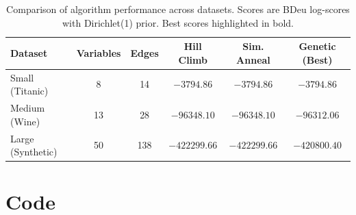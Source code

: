 \documentclass[twoside,11pt]{article}
\begin{document}
\begin{table}[htbp]
\centering
\caption{Comparison of algorithm performance across datasets. Scores are BDeu log-scores with Dirichlet(1) prior. Best scores highlighted in bold.}
\label{tab:results}
\begin{tabular}{lccccc}
\toprule
Dataset & Variables & Edges & Hill Climb & Sim. Anneal & Genetic (Best) \\
\midrule
Small (Titanic) & 8 & 14 & $-3794.86$ & $-3794.86$ & $\mathbf{-3794.86}$ \\
Medium (Wine) & 13 & 28 & $-96348.10$ & $-96348.10$ & $\mathbf{-96312.06}$ \\
Large (Synthetic) & 50 & 138 & $-422299.66$ & $-422299.66$ & $\mathbf{-420800.40}$ \\
\bottomrule
\end{tabular}
\end{table}


\section{Code}
\end{document}
